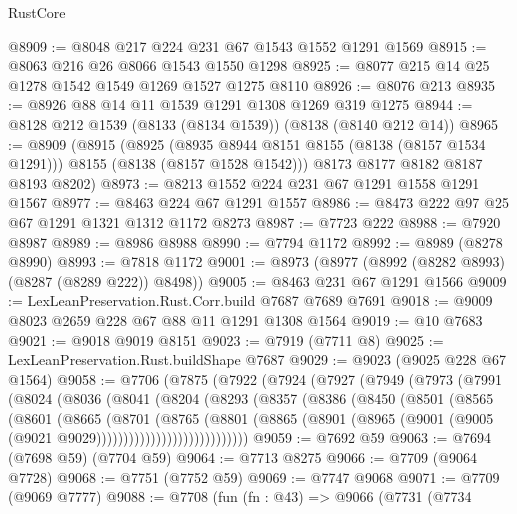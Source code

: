 \begin{lexlean}{RustCore}
\begin{coremodule}
@8909 := @8048 @217 @224 @231 @67 @1543 @1552 @1291 @1569
@8915 := @8063 @216 @26 @8066 @1543 @1550 @1298
@8925 := @8077 @215 @14 @25 @1278 @1542 @1549 @1269 @1527 @1275 @8110
@8926 := @8076 @213
@8935 := @8926 @88 @14 @11 @1539 @1291 @1308 @1269 @319 @1275
@8944 := @8128 @212 @1539 (@8133 (@8134 @1539)) (@8138 (@8140 @212 @14))
@8965 := @8909
    (@8915
      (@8925
        (@8935 @8944 @8151 @8155 (@8138 (@8157 @1534 @1291)))
        @8155
        (@8138 (@8157 @1528 @1542)))
      @8173
      @8177
      @8182
      @8187
      @8193
      @8202)
@8973 := @8213 @1552 @224 @231 @67 @1291 @1558 @1291 @1567
@8977 := @8463 @224 @67 @1291 @1557
@8986 := @8473 @222 @97 @25 @67 @1291 @1321 @1312 @1172 @8273
@8987 := @7723 @222
@8988 := @7920 @8987
@8989 := @8986 @8988
@8990 := @7794 @1172
@8992 := @8989 (@8278 @8990)
@8993 := @7818 @1172
@9001 := @8973 (@8977 (@8992 (@8282 @8993) (@8287 (@8289 @222)) @8498))
@9005 := @8463 @231 @67 @1291 @1566
@9009 := LexLeanPreservation.Rust.Corr.build @7687 @7689 @7691
@9018 := @9009 @8023 @2659 @228 @67 @88 @11 @1291 @1308 @1564
@9019 := @10 @7683
@9021 := @9018 @9019 @8151
@9023 := @7919 (@7711 @8)
@9025 := LexLeanPreservation.Rust.buildShape @7687
@9029 := @9023 (@9025 @228 @67 @1564)
@9058 := @7706
    (@7875
      (@7922
        (@7924
          (@7927
            (@7949
              (@7973
                (@7991
                  (@8024
                    (@8036
                      (@8041
                        (@8204
                          (@8293
                            (@8357
                              (@8386
                                (@8450
                                  (@8501
                                    (@8565
                                      (@8601
                                        (@8665
                                          (@8701
                                            (@8765
                                              (@8801
                                                (@8865
                                                  (@8901
                                                    (@8965
                                                      (@9001
                                                        (@9005
                                                          (@9021 @9029))))))))))))))))))))))))))))
@9059 := @7692 @59
@9063 := @7694 (@7698 @59) (@7704 @59)
@9064 := @7713 @8275
@9066 := @7709 (@9064 @7728)
@9068 := @7751 (@7752 @59)
@9069 := @7747 @9068
@9071 := @7709 (@9069 @7777)
@9088 := @7708
    (fun (fn : @43) =>
    @9066
      (@7731
        (@7734

\end{coremodule}
\end{lexlean}
